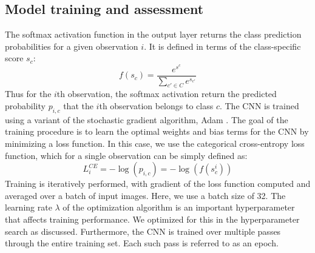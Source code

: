\documentclass[Journal,letterpaper, SingleSpace, InsideFigs]{ascelike-new}
\begin{document}
\subsection{Model training and assessment}
The softmax activation function in the output layer returns the class prediction probabilities for a given observation $i$. It is defined in terms of the class-specific score $s_c$:
\begin{equation}
    f(s_c) = \frac{e^{s^c}}{\sum\limits_{c' \in C} e^{s_{c'}}}
\end{equation}
Thus for the $i$th observation, the softmax activation return the predicted probability $p_{i,c}$ that the $i$th observation belongs to class $c$.
The CNN is trained using a variant of the stochastic gradient algorithm, Adam \cite{kingma2017adam}.
The goal of the training procedure is to learn the optimal weights and bias terms for the CNN by minimizing a loss function. 
In this case, we use the categorical cross-entropy loss function, which for a single observation can be simply defined as:
\begin{equation}
    L_{i}^{CE} = -  \log( p_{i,c}) = - \log(f(s_c^i))
\end{equation}
Training is iteratively performed, with gradient of the loss function computed and averaged over a batch of input images.
Here, we use a batch size of 32.
The learning rate $\lambda$ of the optimization algorithm is an important hyperparameter that affects training performance.
We optimized for this in the hyperparameter search as discussed.
Furthermore, the CNN is trained over multiple passes through the entire training set.
Each such pass is referred to as an epoch.
\end{document}
